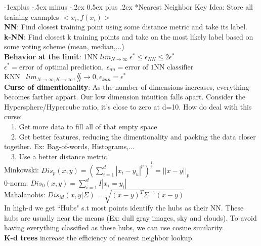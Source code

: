 \documentclass[3pt,landscape]{article}
\makeatletter
\renewcommand{\subsection}{\@startsection{subsection}{2}{0mm}%
                            {-1explus -.5ex minus -.2ex}%
                            {0.5ex plus .2ex}%
                            {\normalfont\normalsize\bfseries}}
\makeatother
\begin{document}
\begin{multicols}{3}

\subsection*{Nearest Neighbor}
Key Idea: Store all training examples $<x_i,f(x_i)>$\\
{\bf NN}: Find closest training point using some distance metric and take its label.\\
{\bf k-NN}: Find closest k training points and take on the most likely label based on some voting scheme (mean, median,...)\\
{\bf Behavior at the limit}: 1NN $lim_{N\to\infty}\ \epsilon^*\le\epsilon_{NN}\le 2\epsilon^*$
$\epsilon^*=\text{error of optimal prediction},\ \epsilon_{nn}=\text{error of 1NN classifier}$\\
KNN \ $lim_{N\to\infty,K\to\infty}, \frac{K}{N}\to 0, \epsilon_{knn}=\epsilon^*$\\
{\bf Curse of dimentionality}: As the number of dimensions increases, everything becomes farther appart. Our low dimension intuition falls apart. Consider the Hypersphere/Hypercube ratio, it's close to zero at d=10.
How do deal with this curse:\\
\ \ 1. Get more data to fill all of that empty space\\
\ \ 2. Get better features, reducing the dimentionality and packing the data closer together. Ex: Bag-of-words, Histograms,...\\
\ \ 3. Use a better distance metric.\\
Minkowski: $Dis_p(x,y)=(\sum_{i=1}^d|x_i-y_u|^p)^{\frac{1}{p}}=||x-y||_p$\\
0-norm: $Dis_0(x,y)=\sum_{i=1}^d I|x_i=y_i|$\\
Mahalanobis: $Dis_M(x,y|\Sigma)=\sqrt{(x-y)^T\Sigma^{-1}(x-y)}$\\
In high-d we get ``Hubs" s.t most points identify the hubs as their NN. These hubs are usually near the means (Ex: dull gray images, sky and clouds). To avoid having everything classified as these hubs, we can use cosine similarity.\\
{\bf K-d trees} increase the efficiency of nearest neighbor lookup.



\end{multicols}
\end{document}
